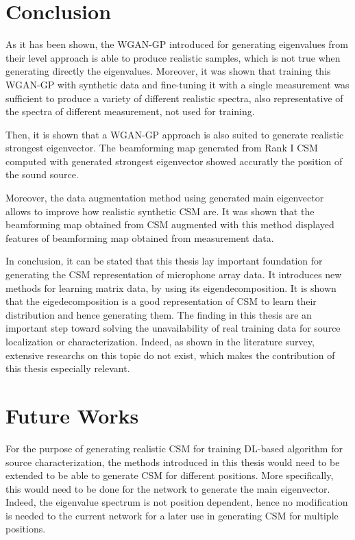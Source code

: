 \documentclass[11pt,a4paper,twoside]{report}
\begin{document}
\chapter{Conclusion}

As it has been shown, the WGAN-GP introduced for generating eigenvalues from their level approach is able to produce realistic samples, which is not true when generating directly the eigenvalues. Moreover, it was shown that training this WGAN-GP with synthetic data and fine-tuning it with a single measurement was sufficient to produce a variety of different realistic spectra, also representative of the spectra of different measurement, not used for training.  

Then, it is shown that a WGAN-GP approach is also suited to generate realistic strongest eigenvector. The beamforming map generated from Rank I CSM computed with generated strongest eigenvector showed accuratly the position of the sound source.

Moreover, the data augmentation method using generated main eigenvector allows to improve how realistic synthetic CSM are. It was shown that the beamforming map obtained from CSM augmented with this method displayed features of beamforming map obtained from measurement data.

In conclusion, it can be stated that this thesis lay important foundation for generating the CSM representation of microphone array data. It introduces new methods for learning matrix data, by using its eigendecomposition. It is shown that the eigedecomposition is a good representation of CSM to learn their distribution and hence generating them. The finding in this thesis are an important step toward solving the unavailability of real training data for source localization or characterization. Indeed, as shown in the literature survey, extensive researchs on this topic do not exist, which makes the contribution of this thesis especially relevant. 


\chapter{Future Works}

For the purpose of generating realistic CSM for training DL-based algorithm for source characterization, the methods introduced in this thesis would need to be extended to be able to generate CSM for different positions. More specifically, this would need to be done for the network to generate the main eigenvector. Indeed, the eigenvalue spectrum is not position dependent, hence no modification is needed to the current network for a later use in generating CSM for multiple positions.
\end{document}
